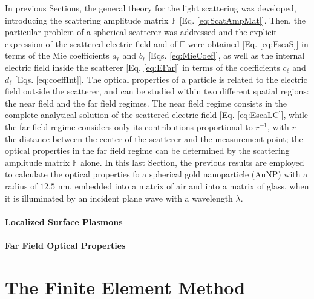 \documentclass[11pt]{Latex/Classes/PhDthesisPSnPDF}
\begin{document}
         In previous Sections, the general theory for the light scattering was developed, introducing the scattering amplitude matrix $\mathbb{F}$ [Eq. \eqref{eq:ScatAmpMat}]. Then, the particular problem of a spherical scatterer was addressed and the explicit expression of the scattered electric field and of $\mathbb{F}$ were obtained [Eq. \eqref{eq:FscaS}] in terms of the Mie coefficients $a_\ell$ and  $b_\ell$ [Eqs. \eqref{eq:MieCoef}], as well as the internal electric field inside the scatterer [Eq. \eqref{eq:EFar}] in terms of the coefficients $c_\ell$ and $d_\ell$ [Eqs. \eqref{eq:coeffInt}]. The  optical properties of a particle is related to the electric field outside the scatterer,  and can be studied within two different spatial regions: the near field and the far field regimes. The near field regime consists in the complete analytical solution of the scattered electric field [Eq. \eqref{eq:EscaLC}], while the far field regime considers only its contributions proportional to $r^{-1}$, with $r$ the distance between the center of the scatterer and the measurement point; the optical properties in the far field regime can be determined by the scattering amplitude matrix $\mathbb{F}$ alone.  In this last Section, the previous results are employed to calculate the optical properties fo  a spherical gold nanoparticle (AuNP) with a radius of $12.5$ nm, embedded into a matrix of air and into a matrix of glass, when it is illuminated by an incident plane wave with a wavelength $\lambda$.

            \subsubsection{Localized Surface Plasmons}
             \label{sss:LSPR}
             

            \subsubsection{Far Field Optical Properties}
             \label{sss:FarField}
             


\chapter{The Finite Element Method}
 \label{chapter:FEM}
\end{document}
